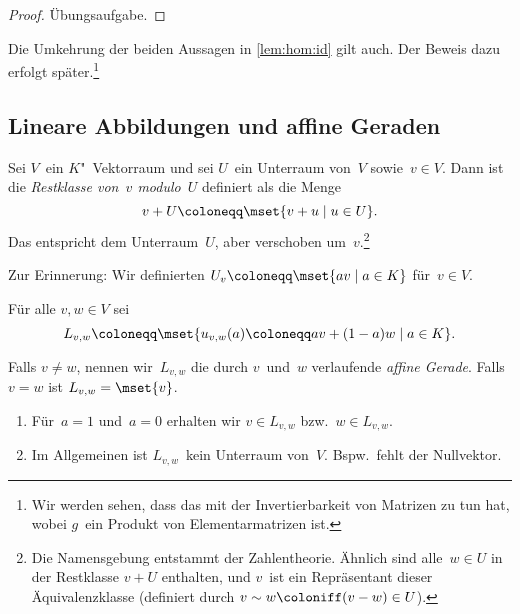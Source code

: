 \documentclass[a4paper]{article}
\begin{document}
\begin{proof}
    Übungsaufgabe.
\end{proof}

\begin{remark}
    Die Umkehrung der beiden Aussagen in \cref{lem:hom:id} gilt auch. Der Beweis dazu erfolgt später.\footnote{Wir werden sehen, dass das mit der Invertierbarkeit von Matrizen zu tun hat, wobei $g$~ein Produkt von Elementarmatrizen ist.}
\end{remark}

\subsection{Lineare Abbildungen und affine Geraden}

\begin{definition}
    Sei $V$~ein $K$"~Vektorraum und sei $U$~ein Unterraum von~$V$ sowie~$v \in V$. Dann ist die \emph{Restklasse von~$v$ modulo~$U$} definiert als die Menge
    \begin{equation*}
        v+U \coloneqq \mset{v+u \mid u \in U}.
    \end{equation*}
    Das entspricht dem Unterraum~$U$, aber verschoben um~$v$.\footnote{Die Namensgebung entstammt der Zahlentheorie. Ähnlich sind alle~$w \in U$ in der Restklasse $v+U$ enthalten, und $v$~ist ein Repräsentant dieser Äquivalenzklasse (definiert durch $v\sim w \coloniff (v-w)\in U$).}
\end{definition}

Zur Erinnerung: Wir definierten $U_v \coloneqq \mset{av \mid a \in K}$ für~$v \in V$.

\begin{definition}
    Für alle $v,w \in V$ sei
    \begin{equation*}
        L_{v,w} \coloneqq \mset{u_{v,w}(a) \coloneqq av + (1-a)w \mid a \in K}.
    \end{equation*}

    Falls $v \neq w$, nennen wir~$L_{v,w}$ die durch $v$~und~$w$ verlaufende \emph{affine Gerade}. Falls $v = w$ ist $L_{v,w} = \mset{v}$.
\end{definition}

\begin{remark}
    \begin{enumerate}
        \item Für~$a = 1$ und~$a = 0$ erhalten wir $v \in L_{v,w}$ bzw.~$w \in L_{v,w}$.
        \item Im Allgemeinen ist $L_{v,w}$~kein Unterraum von~$V$. Bspw.\ fehlt der Nullvektor.
    \end{enumerate}
\end{remark}
\end{document}
